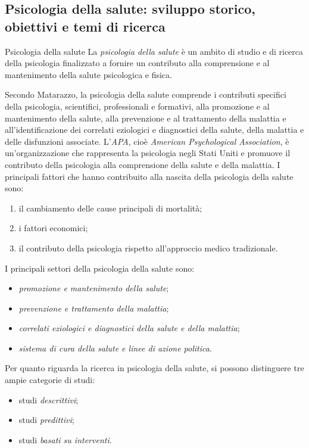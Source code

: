 \documentclass[a4paper]{article}
\begin{document}
\subsection{Psicologia della salute: sviluppo storico, obiettivi e temi di ricerca}
\begin{snippetdefinition}{Psicologia della salute}
    La \emph{psicologia della salute} è un ambito di studio e di ricerca della psicologia finalizzato a fornire un contributo alla comprensione e al mantenimento della salute psicologica e fisica.
\end{snippetdefinition}
Secondo Matarazzo, la psicologia della salute comprende i contributi specifici della psicologia, scientifici, professionali e formativi, alla promozione e al mantenimento della salute, alla prevenzione e al trattamento della malattia e all'identificazione dei correlati eziologici e diagnostici della salute, della malattia e delle disfunzioni associate.
L'\emph{APA}, cioè \emph{American Psychological Association}, è un'organizzazione che rappresenta la psicologia negli Stati Uniti e promuove il contributo della psicologia alla comprensione della salute e della malattia.
I principali fattori che hanno contribuito alla nascita della psicologia della salute sono:
\begin{enumerate}
    \item il cambiamento delle cause principali di mortalità;
    \item i fattori economici;
    \item il contributo della psicologia rispetto all'approccio medico tradizionale.
\end{enumerate}
I principali settori della psicologia della salute sono:
\begin{itemize}
    \item \emph{promozione e mantenimento della salute};
    \item \emph{prevenzione e trattamento della malattia};
    \item \emph{correlati eziologici e diagnostici della salute e della malattia};
    \item \emph{sistema di cura della salute e linee di azione politica}.
\end{itemize}
Per quanto riguarda la ricerca in psicologia della salute, si possono distinguere tre ampie categorie di studi:
\begin{itemize}
    \item studi \emph{descrittivi};
    \item studi \emph{predittivi};
    \item studi \emph{basati su interventi}.
\end{itemize}
\end{document}
